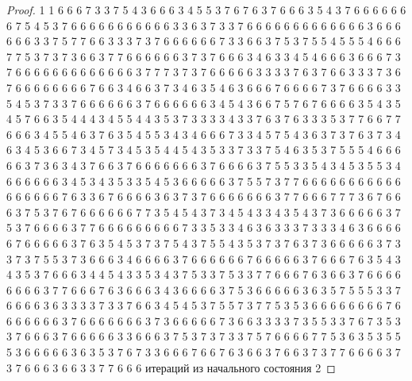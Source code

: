 \begin{proof}
	1 1 6 6 6 7 3 3 7 5 4 3 6 6 6 3 4 5 5 3 7 6 7 6 3 7 6 6 6 3 5 4 3 7 6 6 6 6 6 6 6 7 5 4 5 3 7 6 6 6 6 6 6 6 6 6 6 6 3 3 6 3 7 3 3 7 6 6 6 6 6 6 6 6 6 6 6 6 6 3 6 6 6 6 6 6 3 3 7 5 7 7 6 6 3 3 3 7 3 7 6 6 6 6 6 6 7 3 3 6 6 3 7 5 3 7 5 5 4 5 5 5 4 6 6 6 7 7 5 3 7 3 7 3 6 6 3 7 7 6 6 6 6 6 6 3 7 3 7 6 6 6 3 4 6 3 3 4 5 4 6 6 6 3 6 6 6 7 3 7 6 6 6 6 6 6 6 6 6 6 6 6 6 3 7 7 7 3 7 3 7 6 6 6 6 6 3 3 3 3 7 6 3 7 6 6 3 3 3 7 3 6 7 6 6 6 6 6 6 6 6 7 6 6 3 4 6 6 3 7 3 4 6 3 5 4 6 3 6 6 6 7 6 6 6 6 7 3 7 6 6 6 6 3 3 5 4 5 3 7 3 3 7 6 6 6 6 6 6 3 7 6 6 6 6 6 6 3 4 5 4 3 6 6 7 5 7 6 7 6 6 6 6 3 5 4 3 5 4 5 7 6 6 3 5 4 4 4 3 4 5 5 4 4 3 5 3 7 3 3 3 3 4 3 3 7 6 3 7 6 3 3 3 5 3 7 7 6 6 7 7 6 6 6 3 4 5 5 4 6 3 7 6 3 5 4 5 5 3 4 3 4 6 6 6 7 3 3 4 5 7 5 4 3 6 3 7 3 7 6 3 7 3 4 6 3 4 5 3 6 6 7 3 4 5 7 3 4 5 3 5 4 4 5 4 3 5 3 3 7 3 3 7 5 4 6 3 5 3 7 5 5 5 4 6 6 6 6 6 3 7 3 6 3 4 3 7 6 6 3 7 6 6 6 6 6 6 6 3 7 6 6 6 6 3 7 5 5 3 3 5 4 3 4 5 3 5 5 3 4 6 6 6 6 6 6 3 4 5 3 4 3 5 3 3 5 4 5 3 6 6 6 6 6 3 7 5 5 7 3 7 7 6 6 6 6 6 6 6 6 6 6 6 6 6 6 6 6 6 7 6 3 3 6 7 6 6 6 6 3 6 3 7 3 7 6 6 6 6 6 6 6 3 7 7 6 6 6 7 7 7 3 6 7 6 6 6 3 7 5 3 7 6 7 6 6 6 6 6 6 7 7 3 5 4 5 4 3 7 3 4 5 4 3 3 4 3 5 4 3 7 3 6 6 6 6 6 3 7 5 3 7 6 6 6 6 3 7 7 6 6 6 6 6 6 6 6 6 7 3 3 5 3 3 4 6 3 6 3 3 3 7 3 3 3 4 6 3 6 6 6 6 6 7 6 6 6 6 6 3 7 6 3 5 4 5 3 7 3 7 5 4 3 7 5 5 4 3 5 3 7 3 7 6 3 7 3 6 6 6 6 6 3 7 3 3 7 3 7 5 5 3 7 3 6 6 6 3 4 6 6 6 6 3 7 6 6 6 6 6 6 7 6 6 6 6 6 3 7 6 6 6 7 6 3 5 4 3 4 3 5 3 7 6 6 6 3 4 4 5 4 3 3 5 3 4 3 7 5 3 3 7 5 3 3 7 7 6 6 6 7 6 3 6 6 3 7 6 6 6 6 6 6 6 6 3 7 7 6 6 6 7 6 3 6 6 6 3 4 3 6 6 6 6 3 7 5 3 6 6 6 6 6 3 6 3 5 7 5 5 5 3 3 7 6 6 6 6 3 6 3 3 3 3 7 3 3 7 6 6 3 4 5 4 5 3 7 5 5 7 3 7 7 5 3 5 3 6 6 6 6 6 6 6 6 7 6 6 6 6 6 6 6 3 7 6 6 6 6 6 6 6 3 7 3 6 6 6 6 6 7 3 6 6 3 3 3 3 7 3 5 5 3 3 7 6 7 3 5 3 3 7 6 6 6 3 7 6 6 6 6 6 3 3 6 6 6 3 7 5 3 7 3 7 3 3 7 5 7 6 6 6 6 7 7 5 3 6 3 5 3 5 5 5 3 6 6 6 6 6 3 6 3 5 3 7 6 7 3 3 6 6 6 7 6 6 7 6 3 6 6 3 7 6 6 3 7 3 7 7 6 6 6 6 3 7 3 7 6 6 6 3 6 6 3 3 7 7 6 6 6 
	\newline
	 итераций из начального состояния 2
	\newline

\end{proof}
